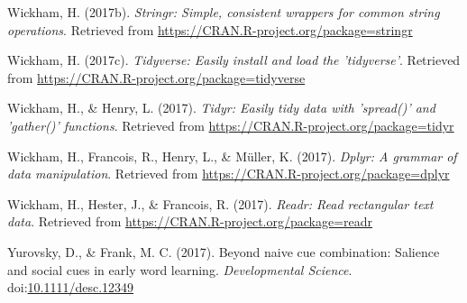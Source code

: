 \documentclass[man]{apa6}
\begin{document}
\hypertarget{ref-R-stringr}{}
Wickham, H. (2017b). \emph{Stringr: Simple, consistent wrappers for
common string operations}. Retrieved from
\url{https://CRAN.R-project.org/package=stringr}

\hypertarget{ref-R-tidyverse}{}
Wickham, H. (2017c). \emph{Tidyverse: Easily install and load the
'tidyverse'}. Retrieved from
\url{https://CRAN.R-project.org/package=tidyverse}

\hypertarget{ref-R-tidyr}{}
Wickham, H., \& Henry, L. (2017). \emph{Tidyr: Easily tidy data with
'spread()' and 'gather()' functions}. Retrieved from
\url{https://CRAN.R-project.org/package=tidyr}

\hypertarget{ref-R-dplyr}{}
Wickham, H., Francois, R., Henry, L., \& Müller, K. (2017). \emph{Dplyr:
A grammar of data manipulation}. Retrieved from
\url{https://CRAN.R-project.org/package=dplyr}

\hypertarget{ref-R-readr}{}
Wickham, H., Hester, J., \& Francois, R. (2017). \emph{Readr: Read
rectangular text data}. Retrieved from
\url{https://CRAN.R-project.org/package=readr}

\hypertarget{ref-yurovsky2017}{}
Yurovsky, D., \& Frank, M. C. (2017). Beyond naive cue combination:
Salience and social cues in early word learning. \emph{Developmental
Science}.
doi:\href{https://doi.org/10.1111/desc.12349}{10.1111/desc.12349}
\end{document}
